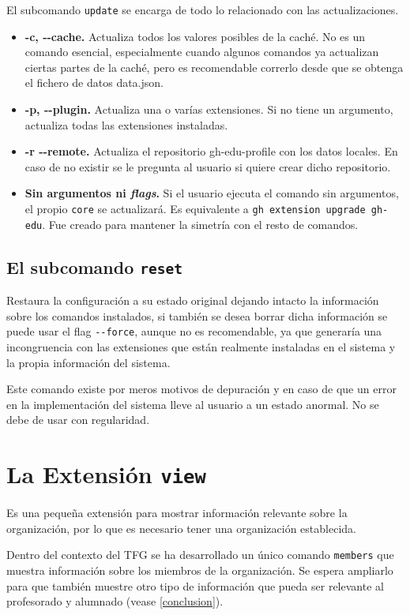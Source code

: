 El subcomando \verb|update| se encarga de todo lo relacionado con las actualizaciones.
\begin{itemize}
    \item \textbf{-c, -{}-cache.} Actualiza todos los valores posibles de la caché. No es un comando esencial, especialmente cuando algunos comandos ya actualizan ciertas partes de la caché, pero es recomendable correrlo desde que se obtenga el fichero de datos data.json.
    \item \textbf{-p, -{}-plugin.} Actualiza una o varías extensiones. Si no tiene un argumento, actualiza todas las extensiones instaladas.
    \item \textbf{-r -{}-remote.} Actualiza el repositorio gh-edu-profile con los datos locales. En caso de no existir se le pregunta al usuario si quiere crear dicho repositorio.
    \item \textbf{Sin argumentos ni \emph{flags}.} Si el usuario ejecuta el comando sin argumentos, el propio \verb|core| se actualizará. Es equivalente a \verb|gh extension upgrade gh-edu|. Fue creado para mantener la simetría con el resto de comandos.
\end{itemize}

\subsection{El subcomando {\tt reset}}
Restaura la configuración a su estado original dejando intacto la información sobre los comandos instalados, si también se desea borrar dicha información se puede usar el flag \verb|--force|, aunque no es recomendable, ya que generaría una incongruencia con las extensiones que están realmente instaladas en el sistema y la propia información del sistema.

Este comando existe por meros motivos de depuración y en caso de que un error en la implementación del sistema lleve al usuario a un estado anormal. No se debe de usar con regularidad.

\section{La Extensión {\tt view}}
Es una pequeña extensión para mostrar información relevante sobre la organización, por lo que es necesario tener una organización establecida.

Dentro del contexto del TFG se ha desarrollado un único comando \verb|members| que muestra información sobre los miembros de la organización. Se espera ampliarlo para que también muestre otro tipo de información que pueda ser relevante al profesorado y alumnado (vease \ref{conclusion}).

